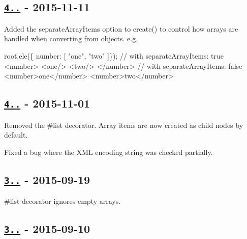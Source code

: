 \subsection*{\href{https://github.com/oozcitak/xmlbuilder-js/compare/v4.0.0...v4.1.0}{\tt 4..} -\/ 2015-\/11-\/11}


\begin{DoxyItemize}
\item Added the {\ttfamily separate\+Array\+Items} option to {\ttfamily create()} to control how arrays are handled when converting from objects. e.\+g.
\end{DoxyItemize}


\begin{DoxyCode}
root.ele(\{ number: [ "one", "two"  ]\});
// with separateArrayItems: true
<number>
  <one/>
  <two/>
</number>
// with separateArrayItems: false
<number>one</number>
<number>two</number>
\end{DoxyCode}


\subsection*{\href{https://github.com/oozcitak/xmlbuilder-js/compare/v3.1.0...v4.0.0}{\tt 4..} -\/ 2015-\/11-\/01}


\begin{DoxyItemize}
\item Removed the {\ttfamily \#list} decorator. Array items are now created as child nodes by default.
\item Fixed a bug where the X\+ML encoding string was checked partially.
\end{DoxyItemize}

\subsection*{\href{https://github.com/oozcitak/xmlbuilder-js/compare/v3.0.0...v3.1.0}{\tt 3..} -\/ 2015-\/09-\/19}


\begin{DoxyItemize}
\item {\ttfamily \#list} decorator ignores empty arrays.
\end{DoxyItemize}

\subsection*{\href{https://github.com/oozcitak/xmlbuilder-js/compare/v2.6.5...v3.0.0}{\tt 3..} -\/ 2015-\/09-\/10}


